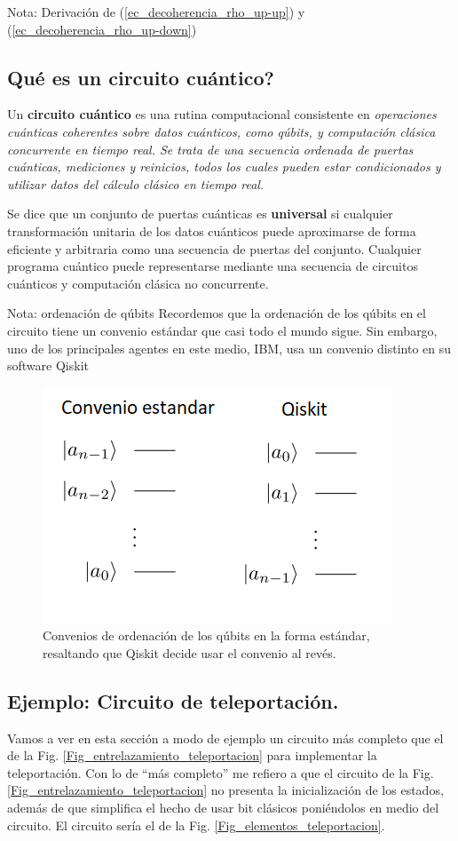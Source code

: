 \documentclass[a4paper,11pt]{book} %
\numberwithin{equation}{chapter}
\begin{document}
\begin{mybox_blue}{Nota: Derivación de (\ref{ec_decoherencia_rho_up-up}) y  (\ref{ec_decoherencia_rho_up-down})}
		\subsection{Qué es un circuito cuántico?}
		
Un \textbf{circuito cuántico} es una rutina computacional consistente en \textit{operaciones cuánticas coherentes sobre datos cuánticos, como qúbits, y computación clásica concurrente en tiempo real. Se trata de una secuencia ordenada de puertas cuánticas, mediciones y reinicios, todos los cuales pueden estar condicionados y utilizar datos del cálculo clásico en tiempo real.}

Se dice que un conjunto de puertas cuánticas es \textbf{universal} si cualquier transformación unitaria de los datos cuánticos puede aproximarse de forma eficiente y arbitraria como una secuencia de puertas del conjunto. Cualquier programa cuántico puede representarse mediante una secuencia de circuitos cuánticos y computación clásica no concurrente.

	\begin{mybox_blue}{Nota: ordenación de qúbits}
	Recordemos que la ordenación de los qúbits en el circuito tiene un convenio estándar que casi todo el mundo sigue. Sin embargo,
	uno de los principales agentes en este medio, IBM, usa un convenio distinto en su software Qiskit
	\begin{figure}[H]
	\centering 
	\includegraphics[width=0.4\linewidth]{Figuras/Fig_multiqubits_convenios_ordenacion}
	\caption{Convenios de ordenación de los qúbits en la forma estándar, resaltando que Qiskit decide usar el convenio al revés.}
	\label{Fig_elementos_convenios_ordenacion}
	\end{figure}
	\end{mybox_blue}
	
		\subsection{Ejemplo: Circuito de teleportación.}

Vamos a ver en esta sección a modo de ejemplo un circuito más completo que el de la Fig. \ref{Fig_entrelazamiento_teleportacion} para implementar la teleportación. Con lo de ``más completo'' me refiero a que el circuito de la Fig. \ref{Fig_entrelazamiento_teleportacion} no presenta la inicialización de los estados, además de que simplifica el hecho de usar bit clásicos poniéndolos en medio del circuito. El circuito sería el de la Fig. \ref{Fig_elementos_teleportacion}.


\end{mybox_blue}
\end{document}
